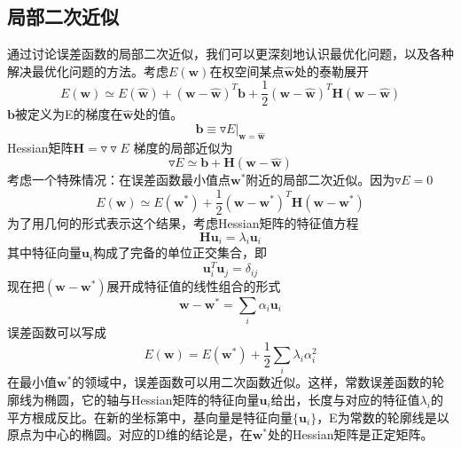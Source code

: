 \subsection*{局部二次近似}
通过讨论误差函数的局部二次近似，我们可以更深刻地认识最优化问题，以及各种解决最优化问题的方法。考虑$E(\boldsymbol{w})$在权空间某点$\hat{\boldsymbol{w}}$处的泰勒展开 
\begin{equation}
	E(\boldsymbol{w})\simeq E(\hat{\boldsymbol{w}})+(\boldsymbol{w}-\hat{\boldsymbol{w}})^T\boldsymbol{b}+\frac{1}{2}(\boldsymbol{w}-\hat{\boldsymbol{w}})^T\boldsymbol{H}(\boldsymbol{w}-\hat{\boldsymbol{w}})
\end{equation}
$\boldsymbol{b}$被定义为E的梯度在$\hat{\boldsymbol{w}}$处的值。
\begin{equation}
	\boldsymbol{b}\equiv \triangledown E|_{\boldsymbol{w}=\hat{\boldsymbol{w}}}
\end{equation}
Hessian矩阵$\boldsymbol{H}=\triangledown\triangledown E$
梯度的局部近似为
\begin{equation}
	\triangledown E\simeq \boldsymbol{b}+\boldsymbol{H}(\boldsymbol{w}-\hat{\boldsymbol{w}})
\end{equation}
考虑一个特殊情况：在误差函数最小值点$\boldsymbol{w}^*$附近的局部二次近似。因为$\triangledown E=0$
\begin{equation}
E(\boldsymbol{w})\simeq E(\boldsymbol{w}^*)+\frac{1}{2}(\boldsymbol{w}-\boldsymbol{w}^*)^T\boldsymbol{H}(\boldsymbol{w}-\boldsymbol{w}^*)
\end{equation}
为了用几何的形式表示这个结果，考虑Hessian矩阵的特征值方程
\begin{equation}
	\boldsymbol{H} \boldsymbol{u}_i=\lambda_i\boldsymbol{u}_i
\end{equation}
其中特征向量$\boldsymbol{u}_i$构成了完备的单位正交集合，即
\begin{equation}
	\boldsymbol{u}_i^T\boldsymbol{u}_j=\delta_{ij}
\end{equation}
现在把$(\boldsymbol{w}-\boldsymbol{w}^*)$展开成特征值的线性组合的形式
\begin{equation}
	\boldsymbol{w}-\boldsymbol{w}^*=\sum_i \alpha_i \boldsymbol{u}_i
\end{equation}
误差函数可以写成
\begin{equation}
	E(\boldsymbol{w})=E(\boldsymbol{w}^*)+\frac{1}{2}\sum_i \lambda_i\alpha_i^2
\end{equation}
在最小值$\boldsymbol{w}^*$的领域中，误差函数可以用二次函数近似。这样，常数误差函数的轮廓线为椭圆，它的轴与Hessian矩阵的特征向量$\boldsymbol{u}_i$给出，长度与对应的特征值$\lambda_i$的平方根成反比。在新的坐标第中，基向量是特征向量$\{\boldsymbol{u}_i\}$，E为常数的轮廓线是以原点为中心的椭圆。对应的D维的结论是，在$\boldsymbol{w}^*$处的Hessian矩阵是正定矩阵。
